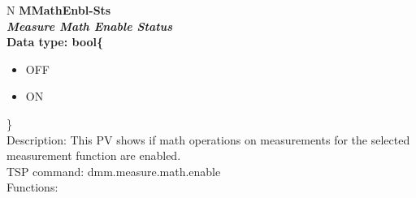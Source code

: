 \documentclass[openany]{article}
\begin{document}
		\begin{tabular}{N}
			\hline
			\bfseries MMathEnbl-Sts\label{pv:mmathenbl-sts} \\ \hline
			\emph{Measure Math Enable Status} \\
			Data type: bool\{\begin{itemize}[noitemsep]
				\small
				\item[] OFF
				\item[] ON
			\end{itemize}\} \\
			Description: This PV shows if math operations on measurements for the selected measurement function are enabled. \\
			TSP command: dmm.measure.math.enable \\
			Functions: \\
			\arrayrulecolor{\FuncTableBorderColor}

		\end{tabular}
\end{document}
